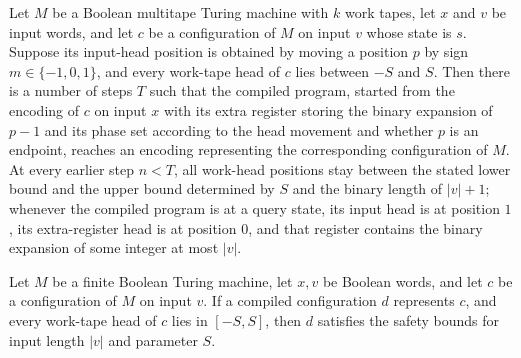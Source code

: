 \begin{theorem}
\label{Complexity.LogProg.OIS.adjust_index}
\leanok
{}
Let $M$ be a Boolean multitape Turing machine with $k$ work tapes, let $x$ and $v$ be
input words, and let $c$ be a configuration of $M$ on input $v$ whose state is $s$.
Suppose its input-head position is obtained by moving a position $p$ by sign
$m\in\{-1,0,1\}$, and every work-tape head of $c$ lies between $-S$ and $S$. Then there
is a number of steps $T$ such that the compiled program, started from the encoding of
$c$ on input $x$ with its extra register storing the binary expansion of $p-1$ and its
phase set according to the head movement and whether $p$ is an endpoint, reaches an
encoding representing the corresponding configuration of $M$. At every earlier step
$n<T$, all work-head positions stay between the stated lower bound and the upper bound
determined by $S$ and the binary length of $|v|+1$; whenever the compiled program is at
a query state, its input head is at position $1$, its extra-register head is at position
$0$, and that register contains the binary expansion of some integer at most $|v|$.
\end{theorem}

\begin{theorem}
\label{Complexity.LogProg.OIS.represents_safe}
\leanok
{}
Let $M$ be a finite Boolean Turing machine, let $x,v$ be Boolean words, and let $c$ be a
configuration of $M$ on input $v$. If a compiled configuration $d$ represents $c$, and
every work-tape head of $c$ lies in $[-S,S]$, then $d$ satisfies the safety bounds for
input length $|v|$ and parameter $S$.
\end{theorem}

